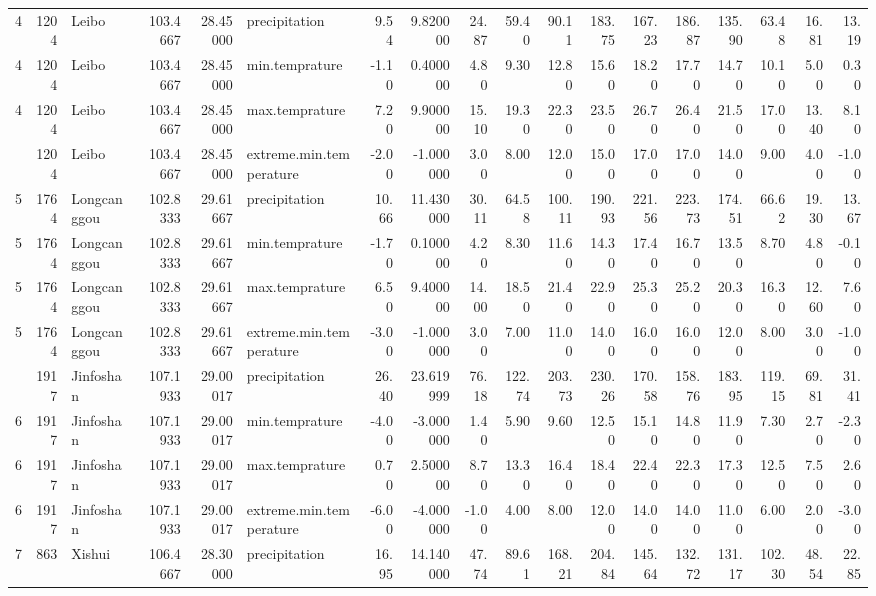 \documentclass[
]{ctexart}
\begin{document}
\begin{table}
{\begin{tabular}{rrlrrlrrrrrrrrrrrr}
4 & 1204 & Leibo & 103.4667 & 28.45000 & precipitation & 9.54 & 9.820000 & 24.87 & 59.40 & 90.11 & 183.75 & 167.23 & 186.87 & 135.90 & 63.48 & 16.81 & 13.19\\
4 & 1204 & Leibo & 103.4667 & 28.45000 & min.temprature & -1.10 & 0.400000 & 4.80 & 9.30 & 12.80 & 15.60 & 18.20 & 17.70 & 14.70 & 10.10 & 5.00 & 0.30\\
4 & 1204 & Leibo & 103.4667 & 28.45000 & max.temprature & 7.20 & 9.900000 & 15.10 & 19.30 & 22.30 & 23.50 & 26.70 & 26.40 & 21.50 & 17.00 & 13.40 & 8.10\\
\addlinespace
4 & 1204 & Leibo & 103.4667 & 28.45000 & extreme.min.temperature & -2.00 & -1.000000 & 3.00 & 8.00 & 12.00 & 15.00 & 17.00 & 17.00 & 14.00 & 9.00 & 4.00 & -1.00\\
5 & 1764 & Longcanggou & 102.8333 & 29.61667 & precipitation & 10.66 & 11.430000 & 30.11 & 64.58 & 100.11 & 190.93 & 221.56 & 223.73 & 174.51 & 66.62 & 19.30 & 13.67\\
5 & 1764 & Longcanggou & 102.8333 & 29.61667 & min.temprature & -1.70 & 0.100000 & 4.20 & 8.30 & 11.60 & 14.30 & 17.40 & 16.70 & 13.50 & 8.70 & 4.80 & -0.10\\
5 & 1764 & Longcanggou & 102.8333 & 29.61667 & max.temprature & 6.50 & 9.400000 & 14.00 & 18.50 & 21.40 & 22.90 & 25.30 & 25.20 & 20.30 & 16.30 & 12.60 & 7.60\\
5 & 1764 & Longcanggou & 102.8333 & 29.61667 & extreme.min.temperature & -3.00 & -1.000000 & 3.00 & 7.00 & 11.00 & 14.00 & 16.00 & 16.00 & 12.00 & 8.00 & 3.00 & -1.00\\
\addlinespace
6 & 1917 & Jinfoshan & 107.1933 & 29.00017 & precipitation & 26.40 & 23.619999 & 76.18 & 122.74 & 203.73 & 230.26 & 170.58 & 158.76 & 183.95 & 119.15 & 69.81 & 31.41\\
6 & 1917 & Jinfoshan & 107.1933 & 29.00017 & min.temprature & -4.00 & -3.000000 & 1.40 & 5.90 & 9.60 & 12.50 & 15.10 & 14.80 & 11.90 & 7.30 & 2.70 & -2.30\\
6 & 1917 & Jinfoshan & 107.1933 & 29.00017 & max.temprature & 0.70 & 2.500000 & 8.70 & 13.30 & 16.40 & 18.40 & 22.40 & 22.30 & 17.30 & 12.50 & 7.50 & 2.60\\
6 & 1917 & Jinfoshan & 107.1933 & 29.00017 & extreme.min.temperature & -6.00 & -4.000000 & -1.00 & 4.00 & 8.00 & 12.00 & 14.00 & 14.00 & 11.00 & 6.00 & 2.00 & -3.00\\
7 & 863 & Xishui & 106.4667 & 28.30000 & precipitation & 16.95 & 14.140000 & 47.74 & 89.61 & 168.21 & 204.84 & 145.64 & 132.72 & 131.17 & 102.30 & 48.54 & 22.85\\

\end{tabular}}
\end{table}
\end{document}

